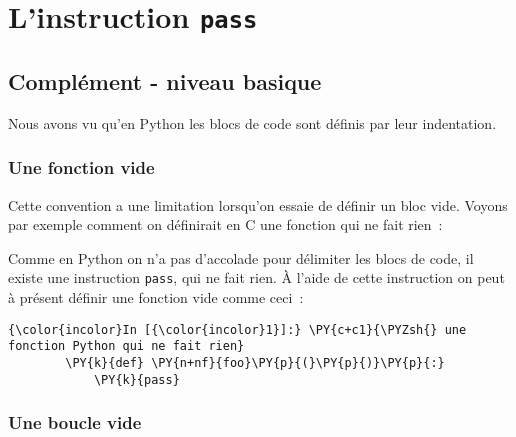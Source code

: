     
    
    
    

    

    \hypertarget{linstruction-pass}{%
\section{\texorpdfstring{L'instruction
\texttt{pass}}{L'instruction pass}}\label{linstruction-pass}}

    \hypertarget{compluxe9ment---niveau-basique}{%
\subsection{Complément - niveau
basique}\label{compluxe9ment---niveau-basique}}

    Nous avons vu qu'en Python les blocs de code sont définis par leur
indentation.

    \hypertarget{une-fonction-vide}{%
\subsubsection{Une fonction vide}\label{une-fonction-vide}}

    Cette convention a une limitation lorsqu'on essaie de définir un bloc
vide. Voyons par exemple comment on définirait en C une fonction qui ne
fait rien~:

    \begin{Shaded}
\begin{Highlighting}[]
\end{Highlighting}
\end{Shaded}

    Comme en Python on n'a pas d'accolade pour délimiter les blocs de code,
il existe une instruction \texttt{pass}, qui ne fait rien. À l'aide de
cette instruction on peut à présent définir une fonction vide comme
ceci~:

    \begin{Verbatim}[commandchars=\\\{\}]
{\color{incolor}In [{\color{incolor}1}]:} \PY{c+c1}{\PYZsh{} une fonction Python qui ne fait rien}
        \PY{k}{def} \PY{n+nf}{foo}\PY{p}{(}\PY{p}{)}\PY{p}{:}
            \PY{k}{pass}
\end{Verbatim}


    \hypertarget{une-boucle-vide}{%
\subsubsection{Une boucle vide}\label{une-boucle-vide}}


